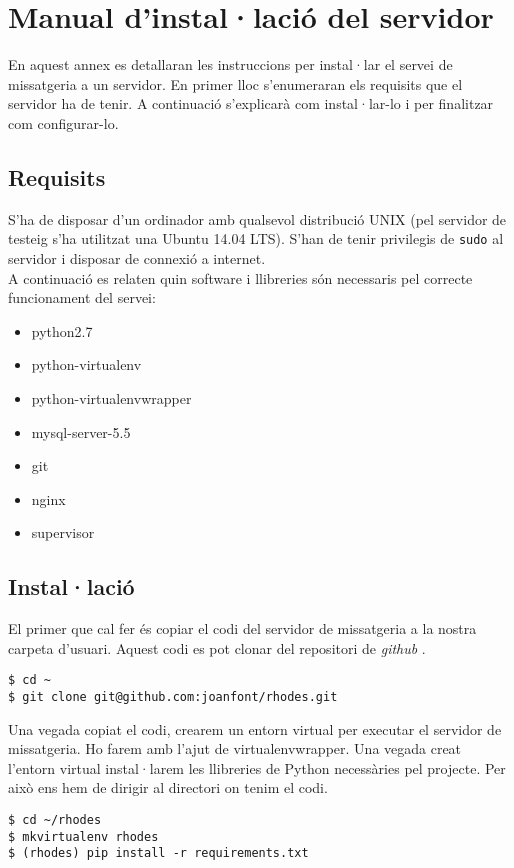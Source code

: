 \chapter{Manual d'instal·lació del servidor}\label{instalacio}
En aquest annex es detallaran les instruccions per instal·lar el servei de missatgeria a un servidor. En primer lloc s'enumeraran els requisits que el servidor ha de tenir. A continuació s'explicarà com instal·lar-lo i per finalitzar com configurar-lo.

\section{Requisits}

S'ha de disposar d'un ordinador amb qualsevol distribució UNIX (pel servidor de testeig s'ha utilitzat una Ubuntu 14.04 LTS). S'han de tenir privilegis de \texttt{sudo} al servidor i disposar de connexió a internet.\\

A continuació es relaten quin software i llibreries són necessaris pel correcte funcionament del servei:
\begin{itemize}
	\item python2.7
	\item python-virtualenv
	\item python-virtualenvwrapper
	\item mysql-server-5.5
	\item git
	\item nginx
	\item supervisor
\end{itemize}
\section{Instal·lació}
El primer que cal fer és copiar el codi del servidor de missatgeria a la nostra carpeta d'usuari. Aquest codi es pot clonar del repositori de \emph{github} \cite{repo}.
\begin{verbatim}
$ cd ~
$ git clone git@github.com:joanfont/rhodes.git
\end{verbatim}

Una vegada copiat el codi, crearem un entorn virtual per executar el servidor de missatgeria. Ho farem amb l'ajut de virtualenvwrapper. Una vegada creat l'entorn virtual instal·larem les llibreries de Python necessàries pel projecte. Per això ens hem de dirigir al directori on tenim el codi.

\begin{verbatim}
$ cd ~/rhodes
$ mkvirtualenv rhodes
$ (rhodes) pip install -r requirements.txt
\end{verbatim}

